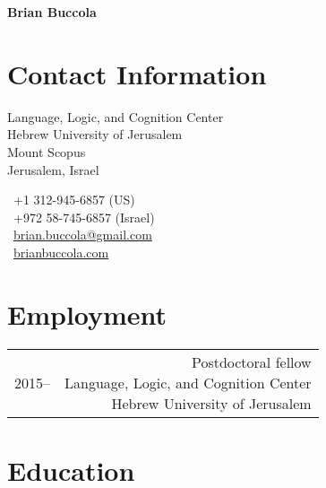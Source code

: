 \documentclass[11pt,letterpaper,twoside]{article}
\makeatletter
\newcommand{\bodywidth}{0.75}
\newenvironment{cvsection}{%
  \renewcommand{\arraystretch}{1.75}
  \begin{longtable}[l]{@{} L R @{}}
}{%
  \end{longtable}
}
\makeatother
\begin{document}
\thispagestyle{first}

\begin{center}
  {\Huge\bfseries Brian Buccola}
\end{center}

\vspace{1em}

\section*{Contact Information}

\begin{minipage}[t]{0.63\textwidth}
  Language, Logic, and Cognition Center\\
  Hebrew University of Jerusalem\\
  Mount Scopus\\
  Jerusalem, Israel
\end{minipage}
\begin{minipage}[t]{0.36\textwidth}
  \Telefon\ +1 312-945-6857 {\footnotesize (US)}\\
  \Telefon\ +972 58-745-6857 {\footnotesize (Israel)}\\
  \Letter\ \href{mailto:brian.buccola@gmail.com}{\ttfamily brian.buccola@gmail.com}\\
  \Keyboard\ \href{http://brianbuccola.com/}{\ttfamily brianbuccola.com}
\end{minipage}

\section*{Employment}

\begin{cvsection}
  2015-- & \parbox[t]{\bodywidth\textwidth}{%
    Postdoctoral fellow\\
    Language, Logic, and Cognition Center\\
    Hebrew University of Jerusalem
  }\\
\end{cvsection}

\section*{Education}
\end{document}

